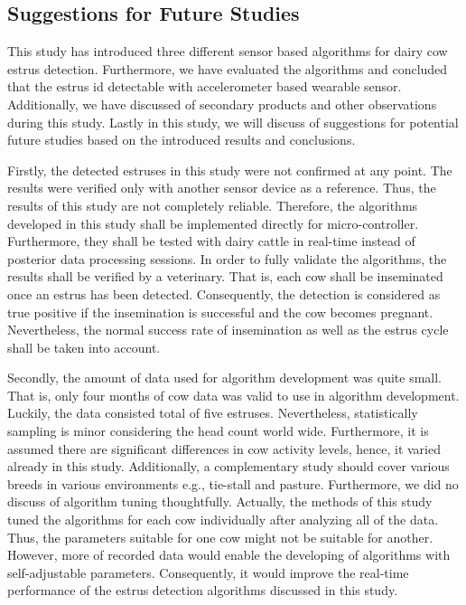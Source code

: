 \documentclass[english,12pt,a4paper,pdftex,elec,utf8]{aaltothesis}
\begin{document}
\subsection{Suggestions for Future Studies}

This study has introduced three different sensor based algorithms for dairy cow estrus detection. Furthermore, we have evaluated the algorithms and concluded that the estrus id detectable with accelerometer based wearable sensor. Additionally, we have discussed of secondary products and other observations during this study. Lastly in this study, we will discuss of suggestions for potential future studies based on the introduced results and conclusions.

Firstly, the detected estruses in this study were not confirmed at any point. The results were verified only with another sensor device as a reference. Thus, the results of this study are not completely reliable. Therefore, the algorithms developed in this study shall be implemented directly for micro-controller. Furthermore, they shall be tested with dairy cattle in real-time instead of posterior data processing sessions. In order to fully validate the algorithms, the results shall be verified by a veterinary. That is, each cow shall be inseminated once an estrus has been detected. Consequently, the detection is considered as true positive if the insemination is successful and the cow becomes pregnant.  Nevertheless, the normal success rate of insemination as well as the estrus cycle shall be taken into account.

Secondly, the amount of data used for algorithm development was quite small. That is, only four months of cow data was valid to use in algorithm development. Luckily, the data consisted total of five estruses. Nevertheless, statistically sampling is minor considering the head count world wide. Furthermore, it is assumed there are significant differences in cow activity levels, hence, it varied already in this study. Additionally, a complementary study should cover various breeds in various environments e.g., tie-stall and pasture. Furthermore, we did no discuss of  algorithm tuning thoughtfully. Actually, the methods of this study tuned the algorithms for each cow individually after analyzing all of the data. Thus, the parameters suitable for one cow might not be suitable for another. However, more of recorded data would enable the developing of algorithms with self-adjustable parameters. Consequently, it would improve the real-time performance of the estrus detection algorithms discussed in this study.
\end{document}
